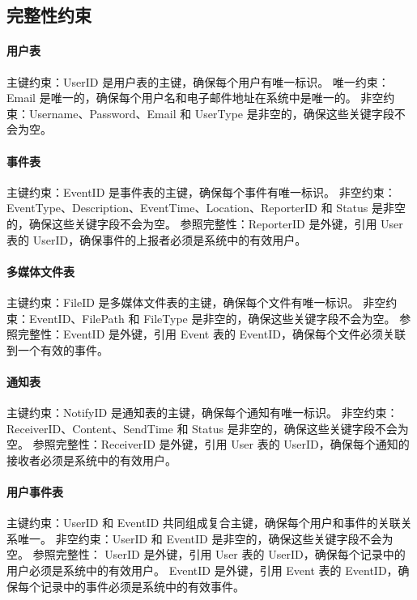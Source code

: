 \subsection{完整性约束}

\paragraph{用户表}

主键约束：UserID 是用户表的主键，确保每个用户有唯一标识。
唯一约束：Email 是唯一的，确保每个用户名和电子邮件地址在系统中是唯一的。
非空约束：Username、Password、Email 和 UserType 是非空的，确保这些关键字段不会为空。

\paragraph{事件表}

主键约束：EventID 是事件表的主键，确保每个事件有唯一标识。
非空约束：EventType、Description、EventTime、Location、ReporterID 和 Status 是非空的，确保这些关键字段不会为空。
参照完整性：ReporterID 是外键，引用 User 表的 UserID，确保事件的上报者必须是系统中的有效用户。

\paragraph{多媒体文件表}

主键约束：FileID 是多媒体文件表的主键，确保每个文件有唯一标识。
非空约束：EventID、FilePath 和 FileType 是非空的，确保这些关键字段不会为空。
参照完整性：EventID 是外键，引用 Event 表的 EventID，确保每个文件必须关联到一个有效的事件。

\paragraph{通知表}

主键约束：NotifyID 是通知表的主键，确保每个通知有唯一标识。
非空约束：ReceiverID、Content、SendTime 和 Status 是非空的，确保这些关键字段不会为空。
参照完整性：ReceiverID 是外键，引用 User 表的 UserID，确保每个通知的接收者必须是系统中的有效用户。

\paragraph{用户事件表}

主键约束：UserID 和 EventID 共同组成复合主键，确保每个用户和事件的关联关系唯一。
非空约束：UserID 和 EventID 是非空的，确保这些关键字段不会为空。
参照完整性：
UserID 是外键，引用 User 表的 UserID，确保每个记录中的用户必须是系统中的有效用户。
EventID 是外键，引用 Event 表的 EventID，确保每个记录中的事件必须是系统中的有效事件。
